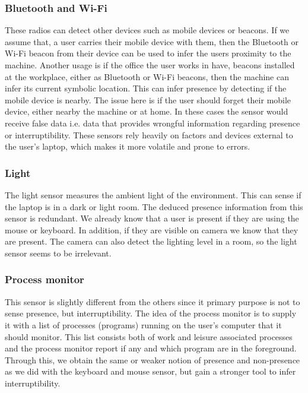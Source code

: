 \documentclass{sigchi}
\begin{document}
\subsubsection{Bluetooth and Wi-Fi}
These radios can detect other devices such as mobile devices or beacons.
If we assume that, a user carries their mobile device with them, then the Bluetooth or Wi-Fi beacon from their device can be used to infer the users proximity to the machine.
Another usage is if the office the user works in have, beacons installed at the workplace, either as Bluetooth or Wi-Fi beacons, then the machine can infer its current symbolic location.
This can infer presence by detecting if the mobile device is nearby.
The issue here is if the user should forget their mobile device, either nearby the machine or at home.
In these cases the sensor would receive false data i.e. data that provides wrongful information regarding presence or interruptibility.
These sensors rely heavily on factors and devices external to the user's laptop, which makes it more volatile and prone to errors.

\subsubsection{Light}
The light sensor measures the ambient light of the environment.
This can sense if the laptop is in a dark or light room.
The deduced presence information from this sensor is redundant.
We already know that a user is present if they are using the mouse or keyboard. In addition, if they are visible on camera we know that they are present.
The camera can also detect the lighting level in a room, so the light sensor seems to be irrelevant.

\subsubsection{Process monitor}
This sensor is slightly different from the others since it primary purpose is not to sense presence, but interruptibility.
The idea of the process monitor is to supply it with a list of processes (programs) running on the user's computer that it should monitor.
This list consists both of work and leisure associated processes and the process monitor report if any and which program are in the foreground.
Through this, we obtain the same or weaker notion of presence and non-presence as we did with the keyboard and mouse sensor, but gain a stronger tool to infer interruptibility.
\end{document}
